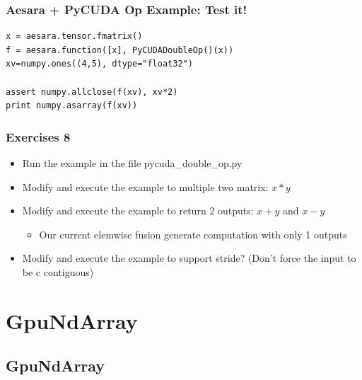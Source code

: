\documentclass[a4paper,9pt]{beamer}
\begin{document}
\begin{frame}[fragile]
\frametitle{Aesara + PyCUDA Op Example: Test it!}
\begin{Verbatim}
x = aesara.tensor.fmatrix()
f = aesara.function([x], PyCUDADoubleOp()(x))
xv=numpy.ones((4,5), dtype="float32")

assert numpy.allclose(f(xv), xv*2)
print numpy.asarray(f(xv))
\end{Verbatim}
\end{frame}

\begin{frame}
\frametitle{Exercises 8}
\begin{itemize}
\item Run the example in the file pycuda\_double\_op.py
\item Modify and execute the example to multiple two matrix: $x * y$
\item Modify and execute the example to return 2 outputs: $x + y$ and $x - y$
  \begin{itemize}
  \item Our current elemwise fusion generate computation with only 1 outputs
  \end{itemize}
\item Modify and execute the example to support stride? (Don't force the input to be c contiguous)
\end{itemize}
\end{frame}

\section{GpuNdArray}
\subsection{GpuNdArray}
\end{document}
